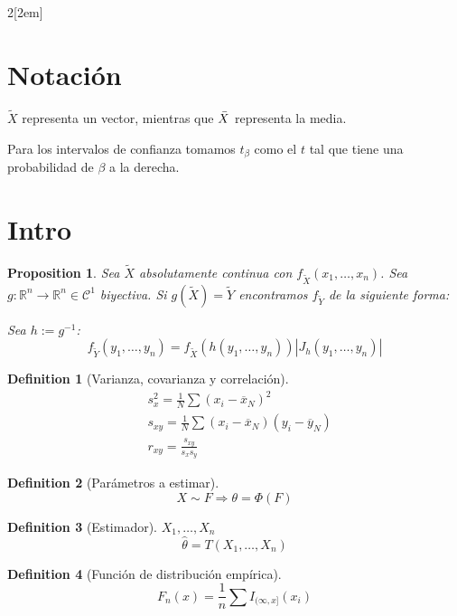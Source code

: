 \documentclass[leqno]{article}
\newtheorem*{proposition}{Proposition}
\newtheorem*{definition}{Definition}
\begin{document}
\begin{multicols}{2}[\columnsep2em]


\section{Notación}

$\tilde{X}$ representa un vector, mientras que $\Bar{X}$ representa la media.

Para los intervalos de confianza tomamos $t_\beta$ como el $t$ tal que tiene una probabilidad de $\beta$ a la derecha.



\section{Intro}

 \begin{proposition}
Sea $\tilde{X}$ absolutamente continua con $f_{\tilde{X}}(x_1,\ldots,x_n)$. Sea $g:\mathbb{R}^n\to \mathbb{R}^n \in \mathcal{C}^1$ biyectiva. Si  $g(\tilde{X})=\tilde{Y}$ encontramos $f_{\tilde{Y}}$ de la siguiente forma:

Sea $h:=g^{-1}$:
\[
f_{\tilde{Y}}(y_1, \ldots, y_n) = f_{\tilde{X}}(h(y_1,\ldots,y_n))|J_h(y_1,\ldots,y_n)|
\] 
\end{proposition}

\begin{definition}[Varianza, covarianza y correlación]
  \begin{align*}
&s_x^2 = \frac{1}{N}\sum (x_i-\overline{x}_N)^2\\
&s_{xy}=\frac{1}{N}\sum(x_i-\overline{x}_N)(y_i-\overline{y}_N) \\
&r_{xy} = \frac{s_{xy}}{s_xs_y}
  \end{align*}
\end{definition}

\begin{definition}[Parámetros a estimar]
\[
X \sim F \Rightarrow \theta = \Phi(F)
\] 
\end{definition}

\begin{definition}[Estimador] $X_1, \ldots, X_n$
\[
\hat{\theta } = T(X_1, \ldots, X_n)
\] 
\end{definition}

\begin{definition}[Función de distribución empírica]
  \[
	F_n(x) = \frac{1}{n}\sum I_{(\infty, x]}(x_i)
  \] 
\end{definition}


\end{multicols}
\end{document}
